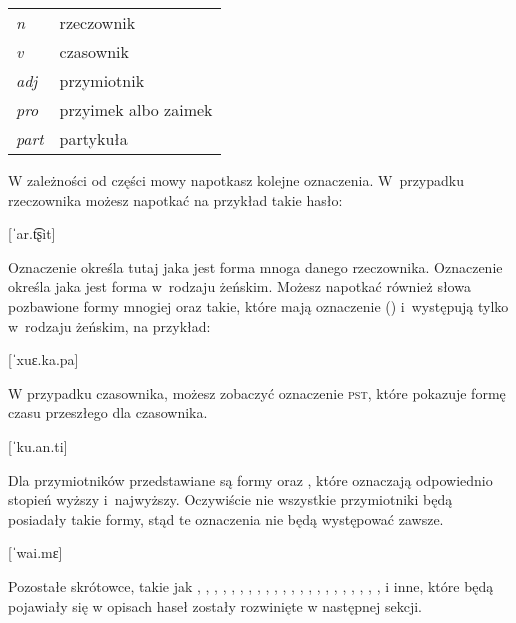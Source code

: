 \begin{spacing}{1.1}
    \begin{table}[h]
        \begin{tabular}{ll}
            \emph{n}    & rzeczownik           \\
            \emph{v}    & czasownik            \\
            \emph{adj}  & przymiotnik          \\
            \emph{pro}  & przyimek albo zaimek \\
            \emph{part} & partykuła
        \end{tabular}
    \end{table}

    W zależności od części mowy napotkasz kolejne oznaczenia. W~przypadku
    rzeczownika możesz napotkać na przykład takie hasło:

    [ˈar.t͡ʂit]
    \skipline

    Oznaczenie \Pl{} określa tutaj jaka jest forma mnoga danego rzeczownika.
    Oznaczenie \Fem{} określa jaka jest forma w~rodzaju żeńskim. Możesz
    napotkać również słowa pozbawione formy mnogiej oraz takie, które mają
    oznaczenie (\Fem{}) i~występują tylko w~rodzaju żeńskim, na przykład:

    \skipline

    [ˈxuɛ.ka.pa]
    \skipline

    W przypadku czasownika, możesz zobaczyć oznaczenie \textsc{pst}, które pokazuje
    formę czasu przeszłego dla czasownika.

    [ˈku.an.ti]
    \skipline

    Dla przymiotników przedstawiane są formy \Comp{} oraz \Supl{}, które
    oznaczają odpowiednio stopień wyższy i~najwyższy. Oczywiście nie wszystkie
    przymiotniki będą posiadały takie formy, stąd te oznaczenia nie będą występować
    zawsze.

    [ˈwai.mɛ]
    \skipline

    Pozostałe skrótowce, takie jak \Dem{}, \Inan{}, \Rel{}, \Refl{}, \Tsg{}, \Ssg{},
    \Tpl{}, \Fpl{}, \Fsg{}, \Poss{}, \Ins{}, \Emph{}, \Imp{}, \Acc{}, \Gen{},
    \Dat{}, \Abl{}, \Loc{}, \Voc{}, \Nfrm{}, \Imp{}, \Cond{}, \Top{} i inne, które
    będą pojawiały się w opisach haseł zostały rozwinięte w następnej sekcji.

    \printglosses[style=list]

\end{spacing}